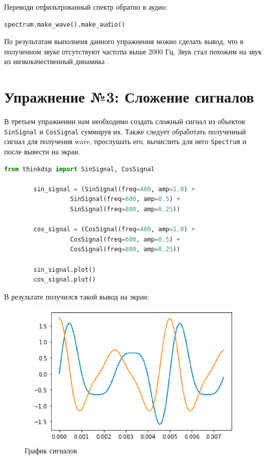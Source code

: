 \documentclass[a4]{article}
\begin{document}
    Переводи отфильтрованный спектр обратно в аудио:

    \begin{lstlisting}[language=Python, caption= Перевод в аудио, label={lst:spectr_to_wav}]
        spectrum.make_wave().make_audio()
    \end{lstlisting}

    По результатам выполнеия данного упражнения можно сделать вывод, что в полученном звуке отсутствуют частоты выше 2000 Гц.
    Звук стал похожим на звук из низкокачественный динамика .

    \newpage


    \section{Упражнение №3: Сложение сигналов}
    \label{sec:3_sum_signal}
    В третьем упражнении нам необходимо создать сложный сигнал из объектов \texttt{SinSignal} и \texttt{CosSignal} суммируя их.
    Также следует обработать полученный сигнал для получения wave, прослушать его, вычислить для него  \texttt{Spectrum} и после вывести на экран.

    \begin{lstlisting}[language=Python, caption= Создание сигналов, label={lst:gen_signal}]
        from thinkdsp import SinSignal, CosSignal

        sin_signal = (SinSignal(freq=400, amp=1.0) +
                  SinSignal(freq=600, amp=0.5) +
                  SinSignal(freq=800, amp=0.25))

        cos_signal = (CosSignal(freq=400, amp=1.0) +
                  CosSignal(freq=600, amp=0.5) +
                  CosSignal(freq=800, amp=0.25))

        sin_signal.plot()
        cos_signal.plot()
    \end{lstlisting}

    В результате получился такой вывод на экран:
    \begin{figure}[H]
        \centering
        \includegraphics[width=\textwidth]{signals}
        \caption{График сигналов}
        \label{fig:signals}
    \end{figure}
\end{document}
